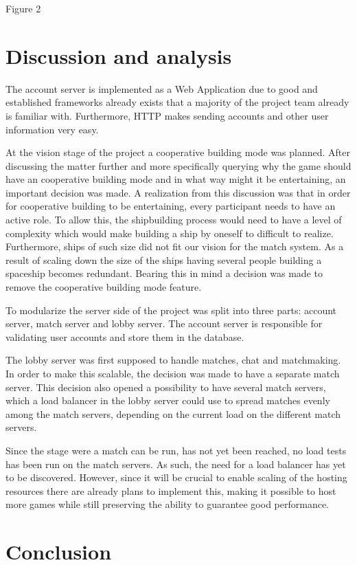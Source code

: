 \documentclass[11pt]{report}
\begin{document}
Figure 2
\section{Discussion and analysis}

The account server is implemented as a Web Application due to good and established frameworks already exists that a majority of the project team already is familiar with. Furthermore, HTTP makes sending accounts and other user information very easy.


At the vision stage of the project a cooperative building mode was planned. After discussing the matter further and more specifically querying why the game should have an cooperative building mode and in what way might it be entertaining, an important decision was made. A realization from this discussion was that in order for cooperative building to be entertaining, every participant needs to have an active role. To allow this, the shipbuilding process would need to have a level of complexity which would make building a ship by oneself to difficult to realize. Furthermore, ships of such size did not fit our vision for the match system. As a result of scaling down the size of the ships having several people building a spaceship becomes redundant. Bearing this in mind a decision was made to remove the cooperative building mode feature.


To modularize the server side of the project was split into three parts: account server, match server and lobby server. The account server is responsible for validating user accounts and store them in the database. 


The lobby server was first supposed to handle matches, chat and matchmaking. In order to make this scalable, the decision was made to have a separate match server. This decision also opened a possibility to have several match servers, which a load balancer in the lobby server could use to spread matches evenly among the match servers, depending on the current load on the different match servers. 


Since the stage were a match can be run, has not yet been reached, no load tests has been run on the match servers. As such, the need for a load balancer has yet to be discovered. However, since it will be crucial to enable scaling of the hosting resources there are already plans to implement this, making it possible to host more games while still preserving the ability to guarantee good performance.
\section{Conclusion}
\end{document}
